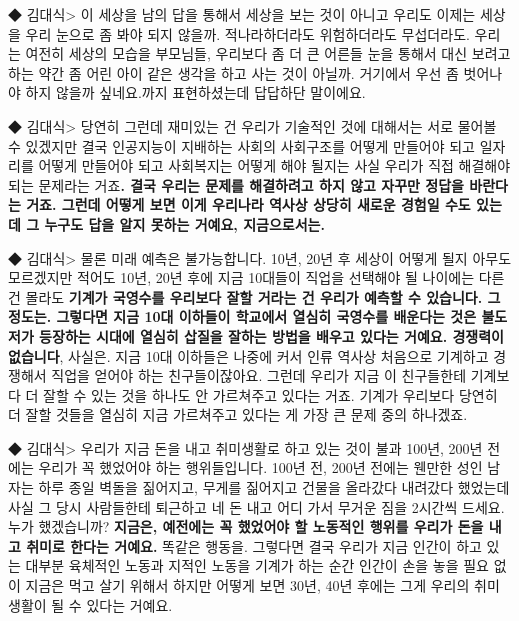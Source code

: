 ◆ 김대식> 이 세상을 남의 답을 통해서 세상을 보는 것이 아니고 우리도 이제는 세상을 우리 눈으로 좀 봐야 되지 않을까. 적나라하더라도 위험하더라도 무섭더라도. 우리는 여전히 세상의 모습을 부모님들, 우리보다 좀 더 큰 어른들 눈을 통해서 대신 보려고 하는 약간 좀 어린 아이 같은 생각을 하고 사는 것이 아닐까. 거기에서 우선 좀 벗어나야 하지 않을까 싶네요.까지 표현하셨는데 답답하단 말이에요.
\vspace{5mm}

◆ 김대식> 당연히 그런데 재미있는 건 우리가 기술적인 것에 대해서는 서로 물어볼 수 있겠지만 결국 인공지능이 지배하는 사회의 사회구조를 어떻게 만들어야 되고 일자리를 어떻게 만들어야 되고 사회복지는 어떻게 해야 될지는 사실 우리가 직접 해결해야 되는 문제라는 거죠\textbf{. 결국 우리는 문제를 해결하려고 하지 않고 자꾸만 정답을 바란다는 거죠. 그런데 어떻게 보면 이게 우리나라 역사상 상당히 새로운 경험일 수도 있는데 그 누구도 답을 알지 못하는 거예요, 지금으로서는.}
\vspace{5mm}

◆ 김대식> 물론 미래 예측은 불가능합니다. 10년, 20년 후 세상이 어떻게 될지 아무도 모르겠지만 적어도 10년, 20년 후에 지금 10대들이 직업을 선택해야 될 나이에는 다른 건 몰라도 \textbf{기계가 국영수를 우리보다 잘할 거라는 건 우리가 예측할 수 있습니다. 그 정도는. 그렇다면 지금 10대 이하들이 학교에서 열심히 국영수를 배운다는 것은 불도저가 등장하는 시대에 열심히 삽질을 잘하는 방법을 배우고 있다는 거예요. 경쟁력이 없습니다}, 사실은. 지금 10대 이하들은 나중에 커서 인류 역사상 처음으로 기계하고 경쟁해서 직업을 얻어야 하는 친구들이잖아요. 그런데 우리가 지금 이 친구들한테 기계보다 더 잘할 수 있는 것을 하나도 안 가르쳐주고 있다는 거죠. 기계가 우리보다 당연히 더 잘할 것들을 열심히 지금 가르쳐주고 있다는 게 가장 큰 문제 중의 하나겠죠.
\vspace{5mm}

◆ 김대식> 우리가 지금 돈을 내고 취미생활로 하고 있는 것이 불과 100년, 200년 전에는 우리가 꼭 했었어야 하는 행위들입니다. 100년 전, 200년 전에는 웬만한 성인 남자는 하루 종일 벽돌을 짊어지고, 무게를 짊어지고 건물을 올라갔다 내려갔다 했었는데 사실 그 당시 사람들한테 퇴근하고 네 돈 내고 어디 가서 무거운 짐을 2시간씩 드세요. 누가 했겠습니까? \textbf{지금은, 예전에는 꼭 했었어야 할 노동적인 행위를 우리가 돈을 내고 취미로 한다는 거예요.} 똑같은 행동을. 그렇다면 결국 우리가 지금 인간이 하고 있는 대부분 육체적인 노동과 지적인 노동을 기계가 하는 순간 인간이 손을 놓을 필요 없이 지금은 먹고 살기 위해서 하지만 어떻게 보면 30년, 40년 후에는 그게 우리의 취미생활이 될 수 있다는 거예요.
\vspace{5mm}


